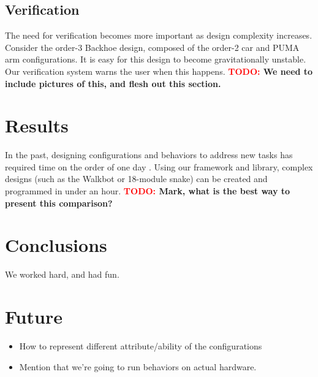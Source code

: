 \documentclass[conference]{IEEEtran}
\theoremstyle{definition}
\newcommand{\TODO}[1]{ {\bf \textcolor{red}{TODO:} #1 }}
\begin{document}
\subsection{Verification}
The need for verification becomes more important as design complexity increases.
 Consider the order-3 Backhoe design, composed of the order-2 car and PUMA arm configurations.
 It is easy for this design to become gravitationally unstable.  Our verification
 system warns the user when this happens. \TODO{We need to include pictures of this,
and flesh out this section.}

\section{Results}
In the past, designing configurations and behaviors to address new tasks has required
time on the order of one day \cite{sastra2011using}. Using our framework and library,
complex designs (such as the Walkbot or 18-module snake) can be created and programmed
in under an hour. \TODO{Mark, what is the best
way to present this comparison?} 

\section{Conclusions}
We worked hard, and had fun.

\section{Future}
\begin{itemize}
\item How to represent different attribute/ability of the configurations
\item Mention that we're going to run behaviors on actual hardware.
\end{itemize}







\end{document}
